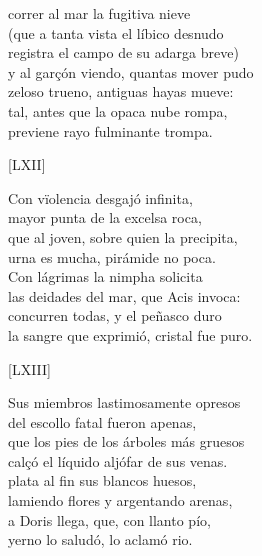 \documentclass[11pt,a4paper,twoside]{article}
\begin{document}
correr al mar la fugitiva nieve\\
(que a tanta vista el líbico desnudo\\
registra el campo de su adarga breve)\\
y al garçón viendo, quantas mover pudo\\
zeloso trueno, antiguas hayas mueve:\\
tal, antes que la opaca nube rompa,\\
previene rayo fulminante trompa.\pend
\begin{center}
	[LXII]
\end{center}\pstart
Con vïolencia desgajó infinita,\\
mayor punta de la excelsa roca,\\
que al joven, sobre quien la precipita,\\
urna es mucha, pirámide no poca.\\
Con lágrimas la nimpha solicita\\
las deidades del mar, que Acis invoca:\\
concurren todas, y el peñasco duro\\
la sangre que exprimió, cristal fue puro.\pend
\begin{center}
	[LXIII]
\end{center}\pstart
Sus miembros lastimosamente opresos\\
del escollo fatal fueron apenas,\\
que los pies de los árboles más gruesos\\
calçó el líquido aljófar de sus venas.\\
 plata al fin sus blancos huesos,\\
lamiendo flores y argentando arenas,\\
a Doris llega, que, con llanto pío,\\
yerno lo saludó, lo aclamó rio.\pend
\endnumbering
\end{document}
